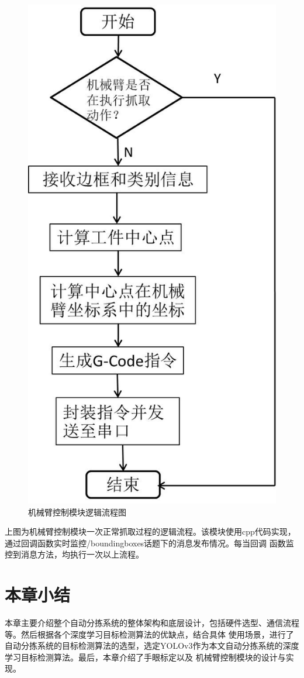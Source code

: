 \begin{figure}
    \centering
    \includegraphics[scale=0.7]{pic/chap2/robot_control.jpg}
    \caption{机械臂控制模块逻辑流程图}
    \label{fig:robot:control}
\end{figure}

上图为机械臂控制模块一次正常抓取过程的逻辑流程。该模块使用cpp代码实现，通过回调函数实时监控/boundingboxes话题下的消息发布情况。每当回调
函数监控到消息方法，均执行一次以上流程。

\section{本章小结}
本章主要介绍整个自动分拣系统的整体架构和底层设计，包括硬件选型、通信流程等。然后根据各个深度学习目标检测算法的优缺点，结合具体
使用场景，进行了自动分拣系统的目标检测算法的选型，选定YOLOv3作为本文自动分拣系统的深度学习目标检测算法。最后，本章介绍了手眼标定以及
机械臂控制模块的设计与实现。


